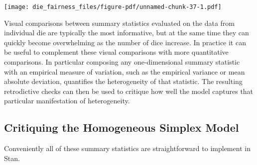 \documentclass[
  letterpaper,
  DIV=11,
  numbers=noendperiod]{scrartcl}
\newenvironment{Shaded}{\begin{snugshade}}{\end{snugshade}}
\newcommand{\AttributeTok}[1]{\textcolor[rgb]{0.40,0.45,0.13}{#1}}
\newcommand{\ConstantTok}[1]{\textcolor[rgb]{0.56,0.35,0.01}{#1}}
\newcommand{\DecValTok}[1]{\textcolor[rgb]{0.68,0.00,0.00}{#1}}
\newcommand{\FloatTok}[1]{\textcolor[rgb]{0.68,0.00,0.00}{#1}}
\newcommand{\FunctionTok}[1]{\textcolor[rgb]{0.28,0.35,0.67}{#1}}
\newcommand{\NormalTok}[1]{\textcolor[rgb]{0.00,0.23,0.31}{#1}}
\newcommand{\OtherTok}[1]{\textcolor[rgb]{0.00,0.23,0.31}{#1}}
\newcommand{\SpecialCharTok}[1]{\textcolor[rgb]{0.37,0.37,0.37}{#1}}
\newcommand{\StringTok}[1]{\textcolor[rgb]{0.13,0.47,0.30}{#1}}
\begin{document}
\begin{Shaded}
\end{Shaded}

\texttt{[image: die\_fairness\_files/figure-pdf/unnamed-chunk-37-1.pdf]}

Visual comparisons between summary statistics evaluated on the data from
individual die are typically the most informative, but at the same time
they can quickly become overwhelming as the number of dice increase. In
practice it can be useful to complement these visual comparisons with
more quantitative comparisons. In particular composing any
one-dimensional summary statistic with an empirical measure of
variation, such as the empirical variance or mean absolute deviation,
quantifies the heterogeneity of that statistic. The resulting
retrodictive checks can then be used to critique how well the model
captures that particular manifestation of heterogeneity.

\subsection{Critiquing the Homogeneous Simplex
Model}\label{critiquing-the-homogeneous-simplex-model}

Conveniently all of these summary statistics are straightforward to
implement in Stan.
\end{document}
